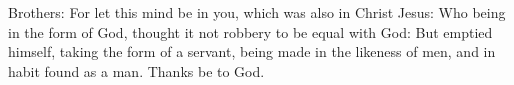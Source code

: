 Brothers: For let this mind be in you, which was also in Christ Jesus: Who being in the form of God, thought it not robbery to be equal with God: But emptied himself, taking the form of a servant, being made in the likeness of men, and in habit found as a man. \rubric{\Rbar} Thanks be to God.